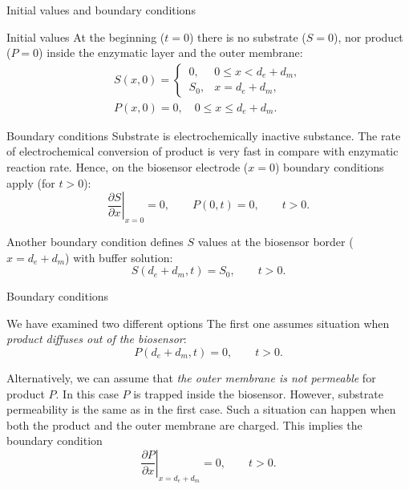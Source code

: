 \documentclass[hyperref={breaklinks=true},fleqn,mathserif]{beamer}
\newcommand{\Sx}{\frac{\partial S}{\partial x}}
\newcommand{\Px}{\frac{\partial P}{\partial x}}
\begin{document}
\begin{frame}[shrink=27]{Initial values and boundary conditions}

\begin{exampleblock}{Initial values}
At the beginning ($t=0$) there is no substrate ($S=0$), nor product ($P=0$) inside the enzymatic layer and the outer membrane:
\begin{gather*}
    S( x, 0 )  =
    \begin{cases}
        \,0,   & 0 \leqslant x < d_e + d_m, \\
        \,S_0, & x = d_e + d_m,
    \end{cases} \\
    P( x, 0 )  =  0,  \quad
    0 \leqslant x \leqslant d_e + d_m.\phantom{lxx}
\end{gather*}
\end{exampleblock}

\pause
\begin{block}{Boundary conditions}
Substrate is electrochemically inactive substance.
The rate of electrochemical conversion of product is very fast in compare with enzymatic reaction rate.
Hence, on the biosensor electrode ($x=0$) boundary conditions apply (for $t>0$):
\[
    \left. \Sx \right|_{x=0}  =  0,  \qquad
    P( 0, t )  =  0,  \qquad  t > 0.
\]

Another boundary condition defines $S$ values at the biosensor border ($x = d_e + d_m$) with buffer solution:
\[
    S( d_e\!+\!d_m, t )  =  S_0,  \qquad  t > 0.
\]
\end{block}

\end{frame}

\begin{frame}{Boundary conditions}

\begin{block}{We have examined two different options}
The first one assumes situation when {\color{blue} \emph{product diffuses out of the biosensor}}:
\[
    P( d_e\!+\!d_m, t )  =  0,  \qquad  t > 0.
\]

\pause
Alternatively, we can assume that {\color{blue} \emph{the outer membrane is not permeable}} for product $P$.
In this case $P$ is trapped inside the biosensor.
However, substrate permeability is the same as in the first case.
Such a situation can happen when both the product and the outer membrane are charged.
This implies the boundary condition
\[
    \left. \Px \right|_{x=d_e+d_m}  =  0,  \qquad  t > 0.
\]
\end{block}

\end{frame}
\end{document}
